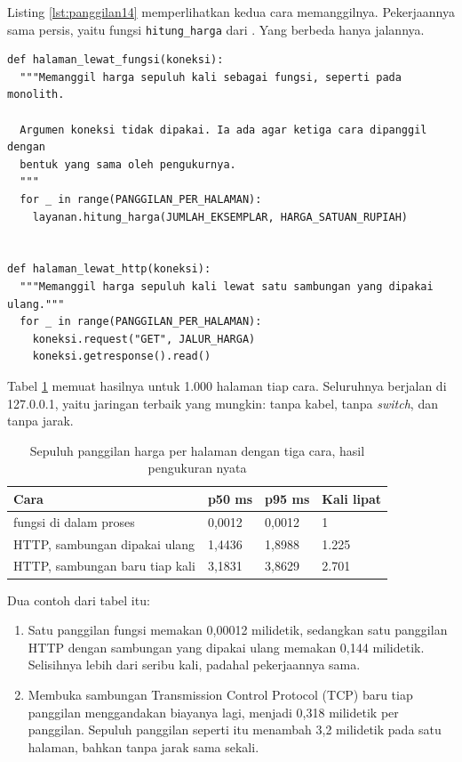 Listing \ref{lst:panggilan14} memperlihatkan kedua cara memanggilnya.
Pekerjaannya sama persis, yaitu fungsi \texttt{hitung\_harga} dari
. Yang berbeda hanya jalannya.

\begin{lstlisting}[style=PythonStyle, caption={Pekerjaan yang sama, dua jalan, tersedia di \berkas{sources/chapter14/panggilan-jaringan.py}}, label={lst:panggilan14}]
def halaman_lewat_fungsi(koneksi):
  """Memanggil harga sepuluh kali sebagai fungsi, seperti pada monolith.

  Argumen koneksi tidak dipakai. Ia ada agar ketiga cara dipanggil dengan
  bentuk yang sama oleh pengukurnya.
  """
  for _ in range(PANGGILAN_PER_HALAMAN):
    layanan.hitung_harga(JUMLAH_EKSEMPLAR, HARGA_SATUAN_RUPIAH)


def halaman_lewat_http(koneksi):
  """Memanggil harga sepuluh kali lewat satu sambungan yang dipakai ulang."""
  for _ in range(PANGGILAN_PER_HALAMAN):
    koneksi.request("GET", JALUR_HARGA)
    koneksi.getresponse().read()
\end{lstlisting}

Tabel \ref{tab:panggilan14} memuat hasilnya untuk 1.000 halaman tiap cara.
Seluruhnya berjalan di 127.0.0.1, yaitu jaringan terbaik yang mungkin: tanpa
kabel, tanpa \textit{switch}, dan tanpa jarak.

\begin{table}[!htb]
  \centering
  \caption{Sepuluh panggilan harga per halaman dengan tiga cara, hasil
           pengukuran nyata}
  \label{tab:panggilan14}
  \begin{tabularx}{\textwidth}{Xlll}
    \hline
    \textbf{Cara} & \textbf{p50 ms} & \textbf{p95 ms} & \textbf{Kali lipat} \\
    \hline
    fungsi di dalam proses & 0,0012 & 0,0012 & 1 \\
    \hline
    HTTP, sambungan dipakai ulang & 1,4436 & 1,8988 & 1.225 \\
    \hline
    HTTP, sambungan baru tiap kali & 3,1831 & 3,8629 & 2.701 \\
    \hline
  \end{tabularx}
\end{table}

Dua contoh dari tabel itu:
\begin{enumerate}
  \item Satu panggilan fungsi memakan 0,00012 milidetik, sedangkan satu
        panggilan HTTP dengan sambungan yang dipakai ulang memakan 0,144 milidetik. Selisihnya lebih dari seribu
        kali, padahal pekerjaannya sama.
  \item Membuka sambungan Transmission Control Protocol (TCP) baru tiap
        panggilan menggandakan biayanya lagi, menjadi 0,318 milidetik per
        panggilan. Sepuluh panggilan seperti itu menambah 3,2 milidetik pada
        satu halaman, bahkan tanpa jarak sama sekali.
\end{enumerate}

